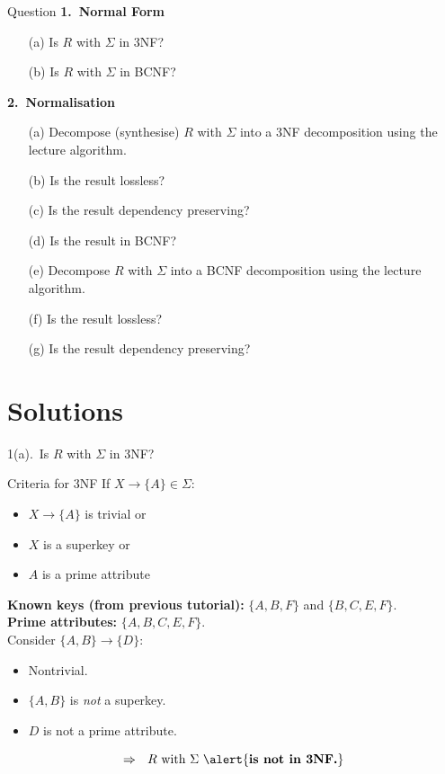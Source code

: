 \documentclass[UTF8]{beamer}
\begin{document}
\begin{frame}{Question}
\footnotesize
\textbf{1.\ Normal Form}
\begin{itemize}
  \item[(a)] Is $R$ with $\Sigma$ in 3NF?
  \item[(b)] Is $R$ with $\Sigma$ in BCNF?
\end{itemize}
\textbf{2.\ Normalisation}
\begin{itemize}
  \item[(a)] Decompose (synthesise) $R$ with $\Sigma$ into a 3NF decomposition using the lecture algorithm.
  \item[(b)] Is the result lossless?
  \item[(c)] Is the result dependency preserving?
  \item[(d)] Is the result in BCNF?
  \item[(e)] Decompose $R$ with $\Sigma$ into a BCNF decomposition using the lecture algorithm.
  \item[(f)] Is the result lossless?
  \item[(g)] Is the result dependency preserving?
\end{itemize}
\end{frame}

\section{Solutions}

\begin{frame}{1(a).\ Is $R$ with $\Sigma$ in 3NF?}
\footnotesize
\pause
\begin{block}{Criteria for 3NF}
    If $X\to \{A\} \in \Sigma$:
    \begin{itemize}
        \item $X\to \{A\}$ is trivial \alert{or}
        \item $X$ is a superkey \alert{or}
        \item $A$ is a prime attribute
    \end{itemize}
\end{block}
\pause
\textbf{Known keys (from previous tutorial):} $\{A,B,F\}$ and $\{B,C,E,F\}$.\\
\textbf{Prime attributes:} $\{A,B,C,E,F\}$.\\
\pause
Consider $\{A,B\}\to\{D\}$:
\begin{itemize}\itemsep2pt
\pause
  \item Nontrivial.
\pause
  \item $\{A,B\}$ is \emph{not} a superkey.
\pause
  \item $D$ is not a prime attribute.
\end{itemize}
\pause
\[
\Rightarrow\ \ R\text{ with }\Sigma\ \alert{\textbf{is not in 3NF.}}
\]
\end{frame}
\end{document}
